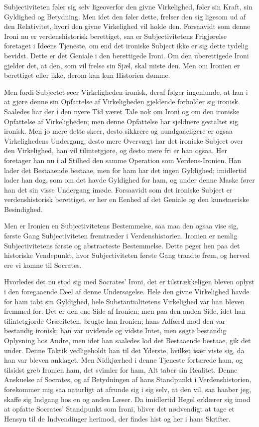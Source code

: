 \documentclass[12pt,a4paper]{article}
\begin{document}
Subjectiviteten føler sig selv ligeoverfor den givne Virkelighed, føler sin Kraft, sin Gyldighed og Betydning. Men idet den føler dette, frelser den sig ligesom ud af den Relativitet, hvori den givne Virkelighed vil holde den. Forsaavidt som denne Ironi nu er verdenshistorisk berettiget, saa er Subjectivitetens Frigjørelse foretaget i Ideens Tjeneste, om end det ironiske Subject ikke er sig dette tydelig bevidst. Dette er det Geniale i den berettigede Ironi. Om den uberettigede Ironi gjelder det, at den, som vil frelse sin Sjæl, skal miste den. Men om Ironien er berettiget eller ikke, derom kan kun Historien dømme.

Men fordi Subjectet seer Virkeligheden ironisk, deraf følger ingenlunde, at han i at gjøre denne sin Opfattelse af Virkeligheden gjeldende forholder sig ironisk. Saaledes har der i den nyere Tid været Tale nok om Ironi og om den ironiske Opfattelse af Virkeligheden; men denne Opfattelse har sjeldnere gestaltet sig ironisk. Men jo mere dette skeer, desto sikkrere og uundgaaeligere er ogsaa Virkelighedens Undergang, desto mere Overvægt har det ironiske Subject over den Virkelighed, han vil tilintetgjøre, og desto mere fri er han ogsaa. Her foretager han nu i al Stilhed den samme Operation som Verdens-Ironien. Han lader det Bestaaende bestaae, men for ham har det ingen Gyldighed; imidlertid lader han dog, som om det havde Gyldighed for ham, og under denne Maske fører han det sin visse Undergang imøde. Forsaavidt som det ironiske Subject er verdenshistorisk berettiget, er her en Eenhed af det Geniale og den kunstneriske Besindighed.

Men er Ironien en Subjectivitetens Bestemmelse, saa maa den ogsaa vise sig, første Gang Subjectiviteten fremtræder i Verdenshistorien. Ironien er nemlig Subjectivitetens første og abstracteste Bestemmelse. Dette peger hen paa det historiske Vendepunkt, hvor Subjectiviteten første Gang traadte frem, og herved ere vi komne til Socrates.

Hvorledes det nu stod sig med Socrates' Ironi, det er tilstrækkeligen bleven oplyst i den foregaaende Deel af denne Undersøgelse. Hele den givne Virkelighed havde for ham tabt sin Gyldighed, hele Substantialitetens Virkelighed var han bleven fremmed for. Det er den ene Side af Ironien; men paa den anden Side, idet han tilintetgjorde Græciteten, brugte han Ironien; hans Adfærd mod den var bestandig ironisk; han var uvidende og vidste Intet, men søgte bestandig Oplysning hos Andre, men idet han saaledes lod det Bestaaende bestaae, gik det under. Denne Taktik vedligeholdt han til det Yderste, hvilket især viste sig, da han var bleven anklaget. Men Nidkjærhed i denne Tjeneste fortærede ham, og tilsidst greb Ironien ham, det svimler for ham, Alt taber sin Realitet. Denne Anskuelse af Socrates, og af Betydningen af hans Standpunkt i Verdenshistorien, forekommer mig saa naturligt at afrunde sig i sig selv, at den vil, saa haaber jeg, skaffe sig Indgang hos en og anden Læser. Da imidlertid Hegel erklærer sig imod at opfatte Socrates' Standpunkt som Ironi, bliver det nødvendigt at tage et Hensyn til de Indvendinger herimod, der findes hist og her i hans Skrifter.
\end{document}
